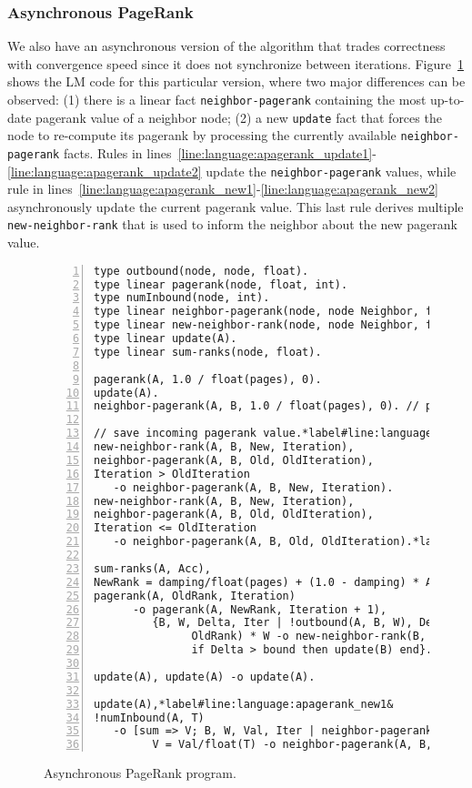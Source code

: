 \subsubsection{Asynchronous PageRank}

We also have an asynchronous version of the algorithm that trades correctness
with convergence speed since it does not synchronize between iterations.
Figure~\ref{language:code:async_pagerank} shows the LM code for this particular
version, where two major differences can be observed: (1) there is a linear fact
\texttt{neighbor-pagerank} containing the most up-to-date pagerank value of a
neighbor node; (2) a new \texttt{update} fact that forces the node to re-compute
its pagerank by processing the currently available \texttt{neighbor-pagerank}
facts. Rules in
lines~\ref{line:language:apagerank_update1}-\ref{line:language:apagerank_update2}
update the \texttt{neighbor-pagerank} values, while rule in
lines~\ref{line:language:apagerank_new1}-\ref{line:language:apagerank_new2}
asynchronously update the current pagerank value. This last rule derives
multiple \texttt{new-neighbor-rank} that is used to inform the neighbor about
the new pagerank value.

\begin{figure}[h!]
\begin{Verbatim}[numbers=left,fontsize=\codesize,commandchars=\*\#\&]
type outbound(node, node, float).
type linear pagerank(node, float, int).
type numInbound(node, int).
type linear neighbor-pagerank(node, node Neighbor, float Rank, int Iteration).
type linear new-neighbor-rank(node, node Neighbor, float Rank, int Iteration).
type linear update(A).
type linear sum-ranks(node, float).

pagerank(A, 1.0 / float(pages), 0).
update(A).
neighbor-pagerank(A, B, 1.0 / float(pages), 0). // pagerank of B is ...

// save incoming pagerank value.*label#line:language:apagerank_update1&
new-neighbor-rank(A, B, New, Iteration),
neighbor-pagerank(A, B, Old, OldIteration),
Iteration > OldIteration
   -o neighbor-pagerank(A, B, New, Iteration).
new-neighbor-rank(A, B, New, Iteration),
neighbor-pagerank(A, B, Old, OldIteration),
Iteration <= OldIteration
   -o neighbor-pagerank(A, B, Old, OldIteration).*label#line:language:apagerank_update2&

sum-ranks(A, Acc),
NewRank = damping/float(pages) + (1.0 - damping) * Acc,
pagerank(A, OldRank, Iteration)
      -o pagerank(A, NewRank, Iteration + 1),
         {B, W, Delta, Iter | !outbound(A, B, W), Delta = fabs(NewRank -
               OldRank) * W -o new-neighbor-rank(B, A, NewRank, Iteration + 1),
               if Delta > bound then update(B) end}.

update(A), update(A) -o update(A).

update(A),*label#line:language:apagerank_new1&
!numInbound(A, T)
   -o [sum => V; B, W, Val, Iter | neighbor-pagerank(A, B, Val, Iter),
         V = Val/float(T) -o neighbor-pagerank(A, B, Val, Iter) -> sum-ranks(A, V)].*label#line:language:apagerank_new2&
\end{Verbatim}
\caption{Asynchronous PageRank program.}
\label{language:code:async_pagerank}
\end{figure}

